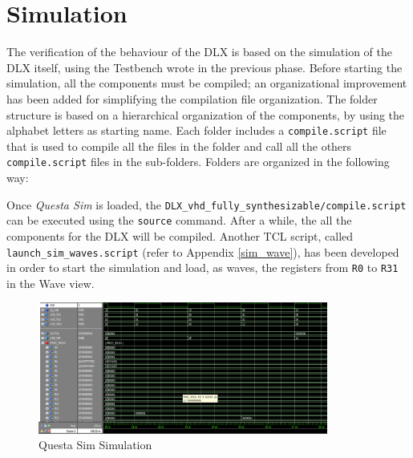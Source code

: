 \section{Simulation}
The verification of the behaviour of the DLX is based on the simulation of the DLX itself, using the Testbench wrote in the previous phase. Before starting the simulation, all the components must be compiled; an organizational improvement has been added for simplifying the compilation file organization. The folder structure is based on a hierarchical organization of the components, by using the alphabet letters as starting name. Each folder includes a \texttt{compile.script} file that is used to compile all the files in the folder and call all the others \texttt{compile.script} files in the sub-folders. Folders are organized in the following way:

\hfill


\hfill


Once \textit{Questa Sim} is loaded, the \texttt{DLX\_vhd\_fully\_synthesizable/compile.script} can be executed using the \texttt{source} command. After a while, the all the components for the DLX will be compiled. Another TCL script, called \texttt{launch\_sim\_waves.script} (refer to Appendix \ref{sim_wave}), has been developed in order to start the simulation and load, as waves, the registers from \texttt{R0} to \texttt{R31} in the Wave view.

\begin{figure}[H]   
	\centering
	\includegraphics[width=0.85\textwidth]{chapters/8_TestingVerification/images/simulation.png}
	\caption{Questa Sim Simulation}
	\label{fig:simulation}
\end{figure}

